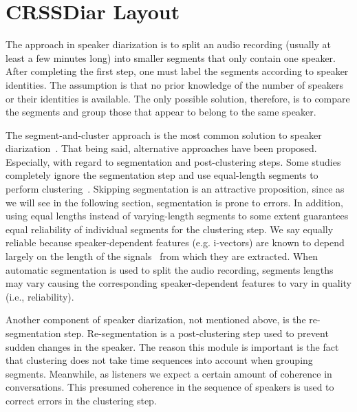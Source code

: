  
\section{CRSSDiar Layout}
\label{sec:crssdiar_layout}

The approach in speaker diarization is to split an audio recording (usually at least a few minutes long) into smaller segments that only contain one speaker.
After completing the first step, one must label the segments according to speaker identities. 
The assumption is that no prior knowledge of the number of speakers or their identities is available. 
The only possible solution, therefore, is to compare the segments and group those that appear to belong to the same speaker. 

The segment-and-cluster approach is the most common solution to speaker diarization~\cite{meignier2010lium,anguera2012diarization}. 
That being said, alternative approaches have been proposed. 
Especially, with regard to segmentation and post-clustering steps. 
Some studies completely ignore the segmentation step and use equal-length segments to perform clustering~\cite{sell_garcia_2015diarization}. 
Skipping segmentation is an attractive proposition, since as we will see in the following section, segmentation is prone to errors. 
In addition, using equal lengths instead of varying-length segments to some extent guarantees equal reliability of individual segments for the clustering step. 
We say equally reliable because speaker-dependent features (e.g. i-vectors) are known to depend largely on the length of the signals~\cite{hasan2013duration} from which they are extracted. 
When automatic segmentation is used to split the audio recording, segments lengths may vary causing the corresponding speaker-dependent features to vary in quality (i.e., reliability). 

Another component of speaker diarization, not mentioned above, is the re-segmentation step. 
Re-segmentation is a post-clustering step used to prevent sudden changes in the speaker. 
The reason this module is important is the fact that clustering does not take time sequences into account when grouping segments. 
Meanwhile, as listeners we expect a certain amount of coherence in conversations. 
This presumed coherence in the sequence of speakers is used to correct errors in the clustering step. 

